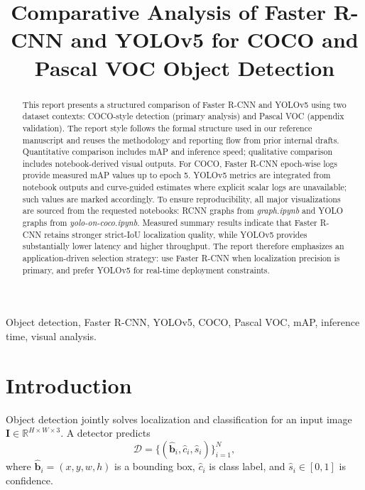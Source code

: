 \documentclass[conference]{IEEEtran}
\begin{document}
\title{Comparative Analysis of Faster R-CNN and YOLOv5 for COCO and Pascal VOC Object Detection}

\author{
}

\maketitle

\begin{abstract}
This report presents a structured comparison of Faster R-CNN and YOLOv5 using two dataset contexts: COCO-style detection (primary analysis) and Pascal VOC (appendix validation). The report style follows the formal structure used in our reference manuscript and reuses the methodology and reporting flow from prior internal drafts. Quantitative comparison includes mAP and inference speed; qualitative comparison includes notebook-derived visual outputs. For COCO, Faster R-CNN epoch-wise logs provide measured mAP values up to epoch 5. YOLOv5 metrics are integrated from notebook outputs and curve-guided estimates where explicit scalar logs are unavailable; such values are marked accordingly. To ensure reproducibility, all major visualizations are sourced from the requested notebooks: RCNN graphs from \textit{graph.ipynb} and YOLO graphs from \textit{yolo-on-coco.ipynb}. Measured summary results indicate that Faster R-CNN retains stronger strict-IoU localization quality, while YOLOv5 provides substantially lower latency and higher throughput. The report therefore emphasizes an application-driven selection strategy: use Faster R-CNN when localization precision is primary, and prefer YOLOv5 for real-time deployment constraints.
\end{abstract}

\begin{IEEEkeywords}
Object detection, Faster R-CNN, YOLOv5, COCO, Pascal VOC, mAP, inference time, visual analysis.
\end{IEEEkeywords}

\section{Introduction}
Object detection jointly solves localization and classification for an input image $\mathbf{I} \in \mathbb{R}^{H\times W\times 3}$. A detector predicts
\begin{equation}
\mathcal{D}=\{(\hat{\mathbf{b}}_i,\hat{c}_i,\hat{s}_i)\}_{i=1}^{N},
\end{equation}
where $\hat{\mathbf{b}}_i=(x,y,w,h)$ is a bounding box, $\hat{c}_i$ is class label, and $\hat{s}_i\in[0,1]$ is confidence.
\end{document}
